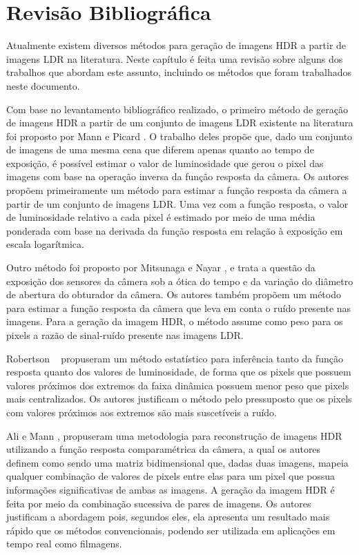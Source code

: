\section{Revisão Bibliográfica} \label{revisaoHDR}
Atualmente existem diversos métodos para geração de imagens HDR a partir de imagens LDR na literatura. Neste capítulo é feita uma revisão sobre alguns dos trabalhos que abordam este assunto, incluindo os métodos que foram trabalhados neste documento.


Com base no levantamento bibliográfico realizado, o primeiro método de geração de imagens HDR a partir de um conjunto de imagens LDR existente na literatura foi proposto por Mann e Picard \cite{mann}. O trabalho deles propõe que, dado um conjunto de imagens de uma mesma cena que diferem apenas quanto ao tempo de exposição, é possível estimar o valor de luminosidade que gerou o pixel das imagens com base na operação inversa da função resposta da câmera. Os autores propõem primeiramente um método para estimar a função resposta da câmera a partir de um conjunto de imagens LDR. Uma vez com a função resposta, o valor de luminosidade relativo a cada pixel é estimado por meio de uma média ponderada com base na derivada da função resposta em relação à exposição em escala logarítmica.


Outro método foi proposto por Mitsunaga e Nayar \cite{mitsunaga}, e trata a questão da exposição dos sensores da câmera sob a ótica do tempo e da variação do diâmetro de abertura do obturador da câmera. Os autores também propõem um método para estimar a função resposta da câmera que leva em conta o ruído presente nas imagens. Para a geração da imagem HDR, o método assume como peso para os pixels a razão de sinal-ruído presente nas imagens LDR.


Robertson \etal~\cite{robertson} propuseram um método estatístico para inferência tanto da função resposta quanto dos valores de luminosidade, de forma que os pixels que possuem valores próximos dos extremos da faixa dinâmica possuem menor peso que pixels mais centralizados. Os autores justificam o método pelo pressuposto que os pixels com valores próximos aos extremos são mais suscetíveis a ruído.


Ali e Mann \cite{ali}, propuseram uma metodologia para reconstrução de imagens HDR utilizando a função resposta comparamétrica da câmera, a qual os autores definem como sendo uma matriz bidimensional que, dadas duas imagens, mapeia qualquer combinação de valores de pixels entre elas para um pixel que possua informações significativas de ambas as imagens. A geração da imagem HDR é feita por meio da combinação sucessiva de pares de imagens. Os autores justificam a abordagem pois, segundos eles, ela apresenta um resultado mais rápido que os métodos convencionais, podendo ser utilizada em aplicações em tempo real como filmagens.


